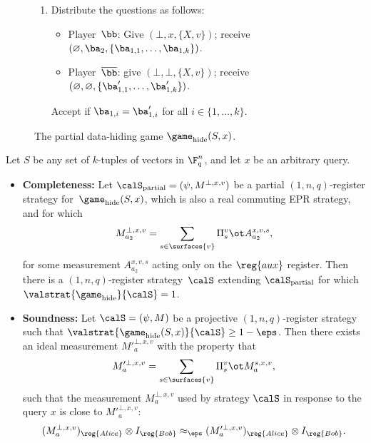 {\begin{figure}[htpb]
\begin{enumerate}
\begin{itemize}
        \item[$\circ$] Player~$\overline{\bb}$: give $(\bot, \bot, \{X, v\})$; receive
        $(\varnothing,\varnothing, \{\ba_{1,1}', \dots \ba_{1,k}'\})$. 
        \end{itemize}
        Accept if $\ba'_{1,i} = v_i \cdot \ba_1$ for all $i \in \{1,
        \dots, k\}$.
      \item 
        Distribute the questions as follows:
        \begin{itemize}
          \item[$\circ$] Player~$\bb$: Give $(\bot, x, \{X, v\})$;
            receive $(\varnothing, \ba_2, \{\ba_{1,1}, \dots,
            \ba_{1,k}\})$.
          \item[$\circ$] Player~$\overline{\bb}$: give $(\bot,
            \bot, \{X, v\})$; receive $(\varnothing,
            \varnothing, \{\ba'_{1,1}, \dots, \ba'_{1,k}\})$.
          \end{itemize}
          Accept if $\ba_{1,i}  = \ba_{1,i}'$ for all $i \in \{1,
          \dots, k\}$.
      \end{enumerate}

\caption{The partial data-hiding game $\game_{\mathrm{hide}}(S, x)$.\label{fig:hide-observable}}
\end{figure}
}

  

\begin{theorem}  \label{thm:partial-data-hiding-game}
  Let $S$ be any set of $k$-tuples of vectors in
  $\F_q^n$, and let $x$ be an arbitrary query.
  \begin{itemize}
  \item[$\circ$]\textbf{Completeness:}
    Let $\calS_{\mathrm{partial}} = (\psi, M^{\bot, x,v})$ be a partial
    $(1,n,q)$-register strategy for~$\game_{\mathrm{hide}}(S,x)$,
    which is also a real commuting EPR strategy, and for which
    \[ M^{\bot, x,v}_{a_2} = \sum_{s \in \surfaces{v}} \Pi^{v}_s \ot A^{x,v,s}_{a_2}, \]
    for some measurement $A^{x,v,s}_{a_2}$ acting only on the
    $\reg{aux}$ register. Then
    there is a $(1,n,q)$-register strategy~$\calS$ extending
    $\calS_{\mathrm{partial}}$ 
    for which
    $\valstrat{\game_{\mathrm{hide}}}{\calS} = 1$.
    \item[$\circ$]\textbf{Soundness:}
      Let $\calS = (\psi, M)$ be a projective
      $(1,n,q)$-register strategy such that
      $\valstrat{\game_{\mathrm{hide}}(S,x)}{\calS}
      \geq 1 - \eps$. Then there exists an ideal measurement $M'^{\bot, x,
        v}_a$ with
      the property that
      \[ M'^{\bot, x,v }_a = \sum_{s \in \surfaces{v}} \Pi^{v}_s \ot
          M^{s,x, v}_a, \]
      such that  the measurement $M^{\bot, x,v}_a$ used by strategy $\calS$ in
      response to the query $x$  is close to $M'^{\bot, x,v}_a$:
      \[ (M_a^{\bot, x,v})_{\reg{Alice}} \otimes I_{\reg{Bob}} \approx_\eps (M'^{\bot, x,v}_a)_{\reg{Alice}} \otimes I_{\reg{Bob}}. \]
    \end{itemize}
\end{theorem}

